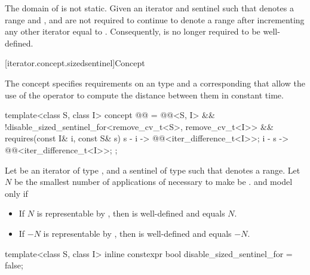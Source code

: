 \pnum
The domain of \tcode{==} is not static.
Given an iterator  and sentinel  such that 
denotes a range and ,  and  are not required to
continue to denote a range after incrementing any other iterator equal
to . Consequently,  is no longer required to be
well-defined.

[iterator.concept.sizedsentinel]{Concept }

\pnum
The  concept specifies
requirements on an  type  and
a corresponding 
that allow the use of the \tcode{-} operator to compute the distance
between them in constant time.

\begin{itemdecl}
template<class S, class I>
  concept @@ =
    @@<S, I> &&
    !disable_sized_sentinel_for<remove_cv_t<S>, remove_cv_t<I>> &&
    requires(const I& i, const S& s) {
      { s - i } -> @@<iter_difference_t<I>>;
      { i - s } -> @@<iter_difference_t<I>>;
    };
\end{itemdecl}

\begin{itemdescr}
\pnum
Let  be an iterator of type , and 
a sentinel of type  such that  denotes a range.
Let $N$ be the smallest number of applications of 
necessary to make  be .
 and  model  only if
\begin{itemize}
\item If $N$ is representable by ,
      then  is well-defined and equals $N$.

\item If $-N$ is representable by ,
      then  is well-defined and equals $-N$.
\end{itemize}
\end{itemdescr}

%
\begin{itemdecl}
template<class S, class I>
  inline constexpr bool disable_sized_sentinel_for = false;
\end{itemdecl}

